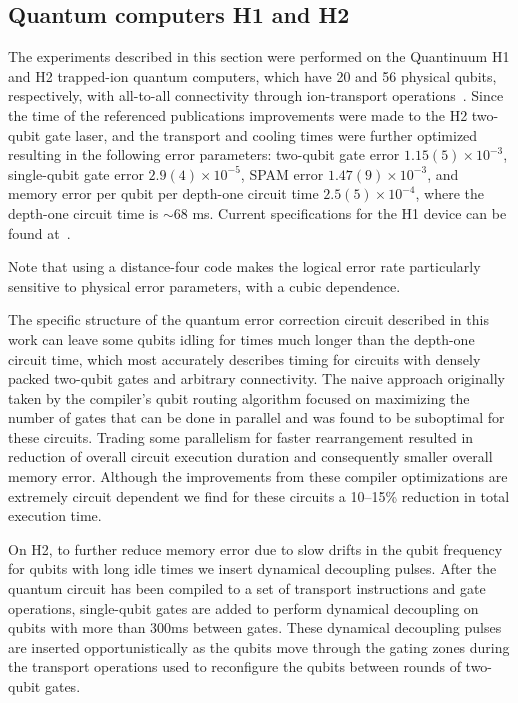 \documentclass[10pt, twocolumn, aps, nofootinbib, longbibliography, nobibnotes, superscriptaddress]{revtex4-1} %
\begin{document}
\subsection{Quantum computers H1 and H2} 

The experiments described in this section were performed on the Quantinuum H1 and H2 trapped-ion quantum computers, which have 20 and 56 physical qubits, respectively, with all-to-all connectivity through ion-transport operations~\cite{quantinuum22h1, Moses23quantinuum, DeCross24randomcircuitsh2}.  Since the time of the referenced publications improvements were made to the H2 two-qubit gate laser, and the transport and cooling times were further optimized resulting in the following error parameters: two-qubit gate error $1.15(5) \times 10^{-3}$, single-qubit gate error $2.9(4) \times 10^{-5}$, SPAM error $1.47(9) \times 10^{-3}$, and memory error per qubit per depth-one circuit time $2.5(5) \times 10^{-4}$, where the depth-one circuit time is $\sim\!68$ ms.  
Current specifications for the H1 device can be found at~\cite{quantinuum24h1}.  

Note that using a distance-four code makes the logical error rate particularly sensitive to physical error parameters, with a cubic dependence.  
 
The specific structure of the quantum error correction circuit described in this work can leave some qubits idling for times much longer than the depth-one circuit time, which most accurately describes timing for circuits with densely packed two-qubit gates and arbitrary connectivity.  The naive approach originally taken by the compiler's qubit routing algorithm focused on maximizing the number of gates that can be done in parallel and was found to be suboptimal for these circuits.  Trading some parallelism for faster rearrangement resulted in reduction of overall circuit execution duration and consequently smaller overall memory error.  Although the improvements from these compiler optimizations are extremely circuit dependent we find for these circuits a 10--15\% reduction in total execution time.  
 
On H2, to further reduce memory error due to slow drifts in the qubit frequency for qubits with long idle times we insert dynamical decoupling pulses.  After the quantum circuit has been compiled to a set of transport instructions and gate operations, single-qubit gates are added to perform dynamical decoupling on qubits with more than 300ms between gates.  These dynamical decoupling pulses are inserted opportunistically as the qubits move through the gating zones during the transport operations used to reconfigure the qubits between rounds of two-qubit gates.  
\end{document}
